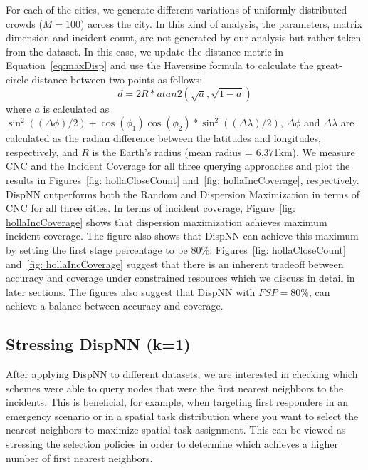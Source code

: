 \documentclass{acm_proc_article-sp}
\begin{document}
For each of the cities, we generate different variations of uniformly distributed crowds ($M = 100$) across the city. In this kind of analysis, the parameters, matrix dimension and incident count, are not generated by our analysis but rather taken from the dataset. In this case, we update the distance metric in Equation~\ref{eq:maxDisp} and use the Haversine formula to calculate the great-circle distance between two points as follows:
\begin{equation} \label{eq:maxDisp2}
d = 2R*atan2(\sqrt{a}, \sqrt{1-a})
\end{equation}
where $a$ is calculated as $ \sin ^2((\Delta \phi)/2 ) + \cos(\phi_1)\cos(\phi_2) * \sin ^2((\Delta \lambda)/2 )$, $\Delta \phi$ and $\Delta \lambda$ are calculated as the radian difference between the latitudes and longitudes, respectively, and $R$ is the Earth's radius (mean radius = 6,371km). We measure CNC and the Incident Coverage for all three querying approaches and plot the results in Figures~\ref{fig: hollaCloseCount} and~\ref{fig: hollaIncCoverage}, respectively. DispNN outperforms both the Random and Dispersion Maximization in terms of CNC for all three cities. In terms of incident coverage, Figure~\ref{fig: hollaIncCoverage} shows that dispersion maximization achieves maximum incident coverage. The figure also shows that DispNN can achieve this maximum by setting the first stage percentage to be $80\%$. Figures~\ref{fig: hollaCloseCount} and~\ref{fig: hollaIncCoverage} suggest that there is an inherent tradeoff between accuracy and coverage under constrained resources which we discuss in detail in later sections. The figures also suggest that DispNN with $FSP = 80\%$, can achieve a balance between accuracy and coverage.\par

\subsection{Stressing DispNN (k=1)}
After applying DispNN to different datasets, we are interested in checking which schemes were able to query nodes that were the first nearest neighbors to the incidents. This is beneficial, for example, when targeting first responders in an emergency scenario or in a spatial task distribution where you want to select the nearest neighbors to maximize spatial task assignment. This can be viewed as stressing the selection policies in order to determine which achieves a higher number of first nearest neighbors.\par
\end{document}
